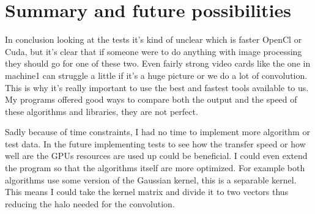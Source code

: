 \chapter{Summary and future possibilities}

In conclusion looking at the tests it's kind of unclear which is faster OpenCl or Cuda, but it's clear that if someone were to do anything with image processing they should go for one of these two. Even fairly strong video cards like the one in machine1 can struggle a little if it's a huge picture or we do a lot of convolution. This is why it's really important to use the best and fastest tools available to us. My programs offered good ways to compare both the output and the speed of these algorithms and libraries, they are not perfect. 

Sadly because of time constraints, I had no time to implement more algorithm or test data. In the future implementing tests to see how the transfer speed or how well are the \ac{GPU}s resources are used up could be beneficial. I could even extend the program so that the algorithms itself are more optimized. For example both algorithms use some version of the Gaussian kernel, this is a separable kernel. This means I could take the kernel matrix and divide it to two vectors thus reducing the halo needed for the convolution.